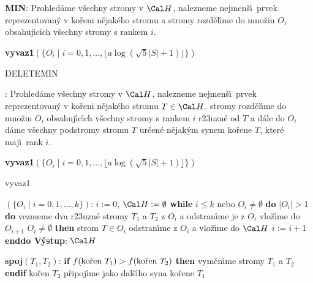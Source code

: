 {\bf MIN}:\newline 
Prohled\'ame v\v sechny stromy v $\Cal H$, nalezneme nejmen\v s\'\i\ prvek 
repre\-zentovan\'y v ko\v reni n\v ejak\'eho stromu a stromy 
rozd\v el\'\i me do mno\v zin $O_i$ obsahuj\'\i c\'\i ch v\v sechny stromy  
s rankem $i$.\newline 
{\bf vyvaz1$(\{O_i\mid i=0,1,\dots,\lfloor a\log(\sqrt 5|S|+1)\rfloor 
\})$
\bigskip

DELETEMIN}:\newline 
Prohled\'ame v\v sechny stromy v $\Cal H$, nalezneme nejmen\v s\'\i\ prvek 
repre\-zentovan\'y v ko\v reni n\v ejak\'eho stromu $T\in \Cal H$, stromy 
rozd\v e\-l\'\i me do mno\v zin $O_i$ obsahuj\'\i c\'\i ch v\v sechny stromy  
s rankem $i$ r\accent23uzn\'e od $T$ a d\'ale do 
$O_i$ d\'ame v\v sechny podstromy stromu $T$ ur\v cen\'e n\v ejak\'ym synem ko\v rene $T$, kter\'e maj\'\i\ rank $i$.\newline 
{\bf vyvaz1$(\{O_i\mid i=0,1,\dots,\lfloor a\log(\sqrt 5|S|+1)\rfloor 
\})$
\bigskip

vyvaz1}$(\{O_i\mid i=0,1,\dots,k\})$:\newline 
$i:=0$, $\Cal H:=\emptyset$\newline 
{\bf while} $i\le k$ nebo $O_i\ne\emptyset$ {\bf do}\newline 
\phantom{---}{\bf while} $|O_i|>1$ {\bf do\newline}
\phantom{------}vezmeme dva r\accent23uzn\'e stromy $T_1$ a $T_2$ z $O_i$ a 
odstran\'\i me je z $O_i$\newline 
\phantom{------}{\bf spoj$(T_1,T_2)$} vlo\v z\'\i me do $O_{i+1}$\newline 
\phantom{---}{\bf enddo}\newline 
\phantom{---}{\bf if} $O_i\ne\emptyset$ {\bf then}\newline 
\phantom{------}strom $T\in O_i$ odstran\'\i me z $O_i$ a vlo\v z\'\i me do $\Cal H$\newline 
\phantom{---}{\bf endif}\newline
\phantom{---}$i:=i+1$\newline 
{\bf enddo\newline 
V\'ystup}: $\Cal H$
\bigskip

{\bf spoj$(T_1,T_2)$}:\newline 
{\bf if} $f(\text{\rm ko\v ren }T_1)>f(\text{\rm ko\v ren }T_2)$ {\bf then}\newline 
\phantom{---}vym\v en\'\i me stromy $T_1$ a $T_2$\newline 
{\bf endif}\newline 
ko\v ren $T_2$ p\v ripoj\'\i me jako dal\v s\'\i ho syna ko\v rene $
T_1$
\bigskip

